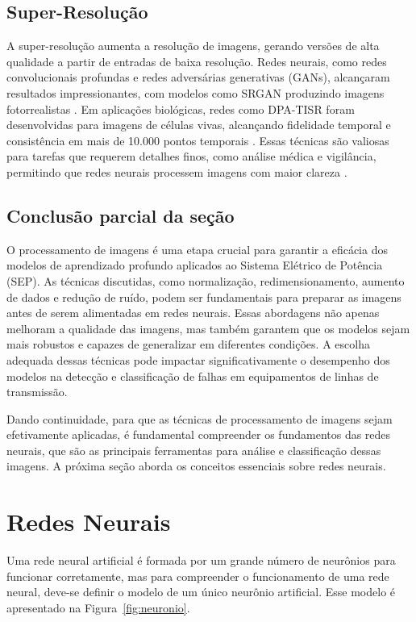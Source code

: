 \subsection{Super-Resolução}
A super-resolução aumenta a resolução de imagens, gerando versões de alta qualidade a partir de entradas de baixa resolução. Redes neurais, como redes convolucionais profundas e redes adversárias generativas (GANs), alcançaram resultados impressionantes, com modelos como SRGAN produzindo imagens fotorrealistas \cite{ledig2017photo}. Em aplicações biológicas, redes como DPA-TISR foram desenvolvidas para imagens de células vivas, alcançando fidelidade temporal e consistência em mais de 10.000 pontos temporais \cite{liu2025neural}. Essas técnicas são valiosas para tarefas que requerem detalhes finos, como análise médica e vigilância, permitindo que redes neurais processem imagens com maior clareza \cite{ledig2017photo}.

\subsection{Conclusão parcial da seção}

O processamento de imagens é uma etapa crucial para garantir a eficácia dos modelos de aprendizado profundo aplicados ao Sistema Elétrico de Potência (SEP). As técnicas discutidas, como normalização, redimensionamento, aumento de dados e redução de ruído, podem ser fundamentais para preparar as imagens antes de serem alimentadas em redes neurais. Essas abordagens não apenas melhoram a qualidade das imagens, mas também garantem que os modelos sejam mais robustos e capazes de generalizar em diferentes condições. A escolha adequada dessas técnicas pode impactar significativamente o desempenho dos modelos na detecção e classificação de falhas em equipamentos de linhas de transmissão.

Dando continuidade, para que as técnicas de processamento de imagens sejam efetivamente aplicadas, é fundamental compreender os fundamentos das redes neurais, que são as principais ferramentas para análise e classificação dessas imagens. A próxima seção aborda os conceitos essenciais sobre redes neurais.

\section{Redes Neurais}
Uma rede neural artificial é formada por um grande número de neurônios para funcionar corretamente, mas para compreender o funcionamento de uma rede neural, deve-se definir o modelo de um único neurônio artificial. Esse modelo é apresentado na Figura~\ref{fig:neuronio}.

